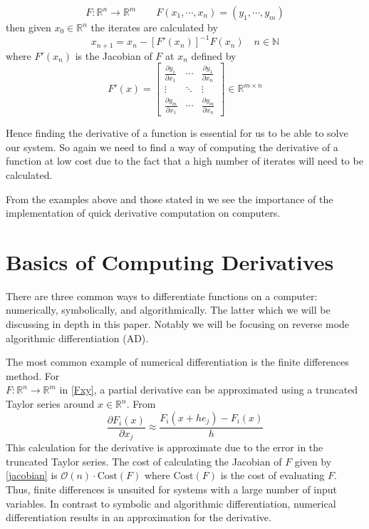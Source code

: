 \documentclass{article}
\begin{document}
\begin{equation} \label{Fxy}
        F: \mathbb{R}^n \rightarrow \mathbb{R}^m \qquad F(x_1, \cdots, x_n) = (y_1, \cdots, y_m)
\end{equation}
then given $x_0 \in \mathbb{R}^n$ the iterates are calculated by
\begin{equation}
x_{n+1} = x_n - [F'(x_n)]^{-1}F(x_n) \quad n \in \mathbb{N}
\end{equation}
where $F'(x_n)$ is the Jacobian of $F$ at $x_n$ defined by
\begin{equation} \label{jacobian}
    F'(x) = \begin{bmatrix}
        \frac{\partial y_1}{\partial x_1} & \cdots & \frac{\partial y_1}{\partial x_n} \\
        \vdots & \ddots & \vdots \\
        \frac{\partial y_m}{\partial x_1} & \cdots & \frac{\partial y_m}{\partial x_n}
    \end{bmatrix} \in \mathbb{R}^{m \times n}
\end{equation}

Hence finding the derivative of a function is essential for us to be able to solve our system. So again we need to find a way of computing the derivative of a function at low cost due to the fact that a high number of iterates will need to be calculated.

From the examples above and those stated in \cite{appad} we see the importance of the implementation of quick derivative computation on computers.

\section{Basics of Computing Derivatives}

There are three common ways to differentiate functions on a computer: numerically, symbolically, and algorithmically. The latter which we will be discussing in depth in this paper. Notably we will be focusing on reverse mode algorithmic differentiation (AD).

The most common example of numerical differentiation is the finite differences method. For \\ $F: \mathbb{R}^n \longrightarrow \mathbb{R}^m$ in \eqref{Fxy}, a partial derivative can be approximated using a truncated Taylor series around $x \in \mathbb{R}^n$. From \cite{chem}
\begin{equation}
    \frac{\partial F_i (x)}{\partial x_j} \approx \frac{F_i(x+he_j) - F_i(x)}{h}
\end{equation}
This calculation for the derivative is approximate due to the error in the truncated Taylor series. The cost of calculating the Jacobian of $F$ given by \eqref{jacobian} is $\mathcal{O}(n)\cdot \mathrm{Cost}(F)$ where $\mathrm{Cost}(F)$ is the cost of evaluating $F$. Thus, finite differences is unsuited for systems with a large number of input variables. In contrast to symbolic and algorithmic differentiation, numerical differentiation results in an approximation for the derivative.
\end{document}
